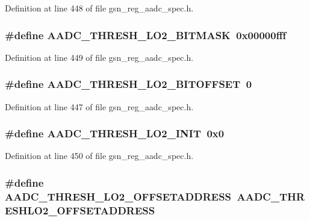 Definition at line 448 of file gsn\_\-reg\_\-aadc\_\-spec.h.

\hypertarget{a00543_a4537ead16b49ccfeb1709d50881bf87c}{
\subsubsection[{AADC\_\-THRESH\_\-LO2\_\-BITMASK}]{\setlength{\rightskip}{0pt plus 5cm}\#define AADC\_\-THRESH\_\-LO2\_\-BITMASK~0x00000fff}}
\label{a00543_a4537ead16b49ccfeb1709d50881bf87c}


Definition at line 449 of file gsn\_\-reg\_\-aadc\_\-spec.h.

\hypertarget{a00543_a6aa7449ea7eb7f08d1c5beab79283c17}{
\subsubsection[{AADC\_\-THRESH\_\-LO2\_\-BITOFFSET}]{\setlength{\rightskip}{0pt plus 5cm}\#define AADC\_\-THRESH\_\-LO2\_\-BITOFFSET~0}}
\label{a00543_a6aa7449ea7eb7f08d1c5beab79283c17}


Definition at line 447 of file gsn\_\-reg\_\-aadc\_\-spec.h.

\hypertarget{a00543_a24a0bfc026cfa80271958cf9f9f99b9d}{
\subsubsection[{AADC\_\-THRESH\_\-LO2\_\-INIT}]{\setlength{\rightskip}{0pt plus 5cm}\#define AADC\_\-THRESH\_\-LO2\_\-INIT~0x0}}
\label{a00543_a24a0bfc026cfa80271958cf9f9f99b9d}


Definition at line 450 of file gsn\_\-reg\_\-aadc\_\-spec.h.

\hypertarget{a00543_a6ed27376a84f4781785e64c2426acff7}{
\subsubsection[{AADC\_\-THRESH\_\-LO2\_\-OFFSETADDRESS}]{\setlength{\rightskip}{0pt plus 5cm}\#define AADC\_\-THRESH\_\-LO2\_\-OFFSETADDRESS~AADC\_\-THRESHLO2\_\-OFFSETADDRESS}}
\label{a00543_a6ed27376a84f4781785e64c2426acff7}


